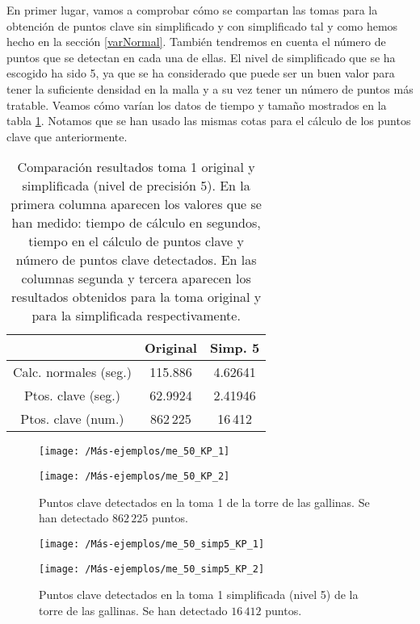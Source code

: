 En primer lugar, vamos a comprobar cómo se compartan las tomas para la obtención de puntos clave sin simplificado y con simplificado tal y como hemos hecho en la sección \ref{varNormal}. También tendremos en cuenta el número de puntos que se detectan en cada una de ellas. El nivel de simplificado que se ha escogido ha sido 5, ya que se ha considerado que puede ser un buen valor para tener la suficiente densidad en la malla y a su vez tener un número de puntos más tratable. Veamos cómo varían los datos de tiempo y tamaño mostrados en la tabla \ref{table:me-normal}. Notamos que se han usado las mismas cotas para el cálculo de los puntos clave que anteriormente.\\

\begin{table}[h!]
	\centering
	\begin{tabular}{| c | c | c |} 
		\hline
		& Original  & Simp. 5 \\
		\hline
		Calc. normales (seg.) & 115.886  &  4.62641\\			 
		Ptos. clave (seg.) & 62.9924 & 2.41946\\
		Ptos. clave (num.) & 862\,225 & 16\,412\\
		\hline
	\end{tabular}
	\caption{Comparación resultados toma 1 original y simplificada (nivel de precisión 5). En la primera columna aparecen los valores que se han medido: tiempo de cálculo en segundos, tiempo en el cálculo de puntos clave y número de puntos clave detectados. En las columnas segunda y tercera aparecen los resultados obtenidos para la toma original y para la simplificada respectivamente.}
	\label{table:me-normal}
\end{table}


\begin{figure}[h!]	
	\begin{minipage}[b]{0.5\textwidth}
		\centering		
		\texttt{[image: /Más-ejemplos/me\_50\_KP\_1]} 
	\end{minipage}
	\begin{minipage}[b]{0.5\textwidth}
		\centering
		\texttt{[image: /Más-ejemplos/me\_50\_KP\_2]}
	\end{minipage}
	\caption{Puntos clave detectados en la toma 1 de la torre de las gallinas. Se han detectado $ 862\,225 $ puntos.}
	\label{me_50_KP}
\end{figure}
\begin{figure}[h!]	
	\begin{minipage}{0.5\textwidth}
		\centering		
		\texttt{[image: /Más-ejemplos/me\_50\_simp5\_KP\_1]} 
	\end{minipage}
	\begin{minipage}{0.5\textwidth}
		\centering
		\texttt{[image: /Más-ejemplos/me\_50\_simp5\_KP\_2]}
	\end{minipage}
	\caption{Puntos clave detectados en la toma 1 simplificada (nivel 5) de la torre de las gallinas. Se han detectado $ 16\,412 $ puntos.}
	\label{me_50_KP_simp4}
\end{figure}

